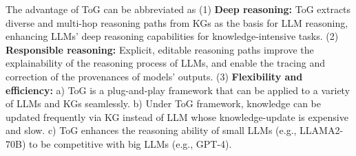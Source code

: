\documentclass{article} %
\begin{document}
The advantage of ToG can be abbreviated as
(1) \textbf{Deep reasoning:}
ToG extracts diverse and multi-hop reasoning paths from KGs as the basis for LLM reasoning, enhancing LLMs' deep reasoning capabilities for knowledge-intensive tasks.
(2) \textbf{Responsible reasoning:}
Explicit, editable reasoning paths improve the explainability of the reasoning process of LLMs, and enable the tracing and correction of the provenances of models' outputs.
(3) \textbf{Flexibility and efficiency:}
a) ToG is a plug-and-play framework that can be applied to a variety of LLMs and KGs seamlessly.
b) Under ToG framework, knowledge can be updated frequently via KG instead of LLM whose knowledge-update is expensive and slow.
c) ToG enhances the reasoning ability of small LLMs (e.g., LLAMA2-70B) to be competitive with big LLMs (e.g., GPT-4).

\end{document}

